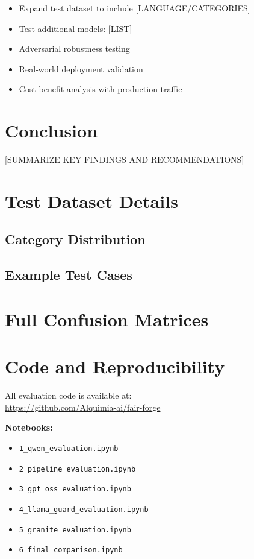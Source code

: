 \documentclass[11pt,a4paper]{article}
\begin{document}
\begin{itemize}
    \item Expand test dataset to include [LANGUAGE/CATEGORIES]
    \item Test additional models: [LIST]
    \item Adversarial robustness testing
    \item Real-world deployment validation
    \item Cost-benefit analysis with production traffic
\end{itemize}

\section{Conclusion}

[SUMMARIZE KEY FINDINGS AND RECOMMENDATIONS]

\appendix

\section{Test Dataset Details}
\subsection{Category Distribution}

\subsection{Example Test Cases}

\section{Full Confusion Matrices}

\section{Code and Reproducibility}
All evaluation code is available at: \\
\url{https://github.com/Alquimia-ai/fair-forge}

\textbf{Notebooks:}
\begin{itemize}
    \item \texttt{1\_qwen\_evaluation.ipynb}
    \item \texttt{2\_pipeline\_evaluation.ipynb}
    \item \texttt{3\_gpt\_oss\_evaluation.ipynb}
    \item \texttt{4\_llama\_guard\_evaluation.ipynb}
    \item \texttt{5\_granite\_evaluation.ipynb}
    \item \texttt{6\_final\_comparison.ipynb}
\end{itemize}


\end{document}
